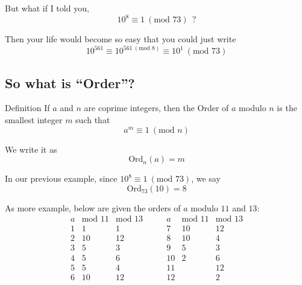 \documentclass[compress]{beamer}
\newcommand{\gap}{\pause\vspace{1em}}
\begin{document}
\begin{frame}
    But what if I told you,
    \textcolor{NordRed}{\[10^8  \equiv 1 \ (\text{mod } 73)\ \ ?\]}

    \gap

    Then your life would become so easy that you could just write
    \[10^{561} \equiv 10^{561 \ (\text{mod } 8)} \equiv 10^1 \ (\text{mod } 73)\] 
\end{frame}

\subsection{So what is ``Order''?}

\begin{frame}{Definition}
    \textcolor{NordBrightBlue}{If $a$ and $n$ are coprime integers, then the
        \textcolor{NordRed}{Order of $a$ modulo $n$} is the smallest integer $m$ such
        that 
        \textcolor{NordRed}{\[a^m \equiv 1 \ (\text{mod } n)\]}
    }

    \pause

    We write it as \textcolor{NordRed}{\[\text{Ord}_n(a) = m\]}

    \pause

    In our previous example, since $10^8 \equiv 1 \ (\text{mod } 73)$, we say
    \[\text{Ord}_{73}(10) = 8\] 
\end{frame}

\begin{frame}
    As more example, below are given the orders of $a$ modulo
    $11$ and $13$:
    \[
        \begin{array}{r|rr}
            a & \text{mod $11$} & \text{mod $13$} \\ \hline
            1  &  1 &  1 \\
            2  & 10 & 12 \\
            3  &  5 &  3 \\
            4  &  5 &  6 \\
            5  &  5 &  4 \\
            6  & 10 & 12
        \end{array}
        \qquad
        \begin{array}{r|rr}
            a & \text{mod $11$} & \text{mod $13$} \\ \hline
            7  & 10 & 12 \\
            8  & 10 &  4 \\
            9  &  5 &  3 \\
            10 &  2 &  6 \\
            11 &    & 12 \\
            12 &    &  2
        \end{array}
    \]

\end{frame}
\end{document}
